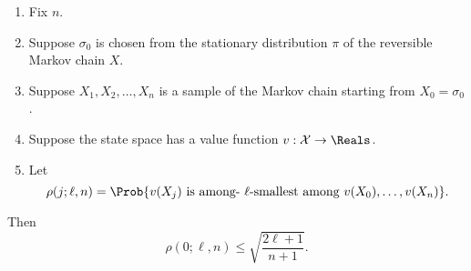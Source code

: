 \documentclass[12pt]{article}
\begin{document}
\begin{example}
\begin{proposition}
    \label{thm:serialsignificance:basethm}
    \begin{enumerate}
        \item
            Fix \( n \).
        \item
            Suppose \( \sigma_0 \) is chosen from the stationary
            distribution \( \pi \) of the reversible Markov chain \( X \).
        \item
            Suppose \( X_1, X_2, \dots, X_n \) is a sample of the Markov
            chain starting from \( X_0 = \sigma_0 \).
        \item
            Suppose the state space has a value function \( v :
            \mathcal {X} \to \Reals \).
        \item
            Let
            \[
                \rho(j; \ell, n) = \Prob{v(X_j) \text{ is among- \(
                    \ell \)-smallest among } v(X_0), \dots, v(X_n) }.
            \]
    \end{enumerate}

    Then
    \[
        \rho(0; \ell, n) \le \sqrt{ \frac{2\ell + 1}{n+1}}.
    \]
\end{proposition}


\end{example}
\end{document}
